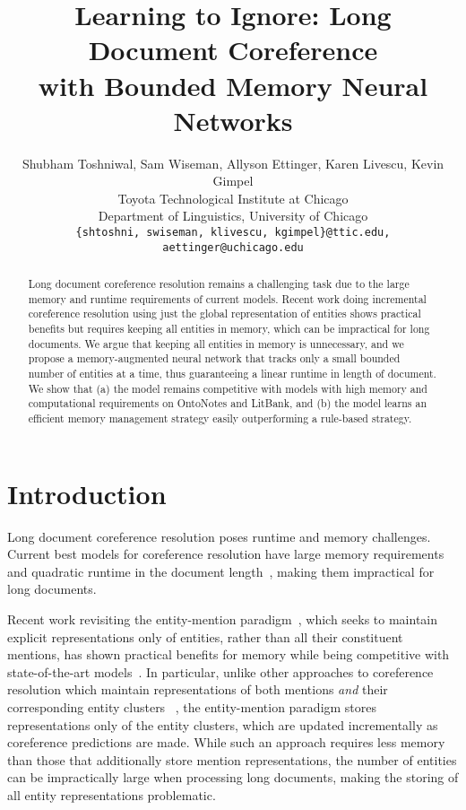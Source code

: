 \documentclass[11pt,a4paper]{article}
\author{Shubham Toshniwal\Mark{1},
Sam Wiseman\Mark{1},
Allyson Ettinger\Mark{2},
Karen Livescu\Mark{1},
Kevin Gimpel\Mark{1}
\\
\Mark{1}Toyota Technological Institute at Chicago\\
\Mark{2}Department of Linguistics, University of Chicago\\[0.5em]
\small{\texttt{\{shtoshni, swiseman, klivescu, kgimpel\}@ttic.edu, aettinger@uchicago.edu}}\\
}
\title{Learning to Ignore: Long Document Coreference \\ with Bounded Memory Neural Networks}
\date{}
\begin{document}
\maketitle
\begin{abstract}
Long document coreference resolution remains a challenging task	 due to the large memory and runtime requirements of current models.
Recent work doing incremental coreference resolution using just the global representation of entities shows practical benefits but requires keeping all entities in memory, which can be impractical for long documents. We argue that keeping all entities in memory is unnecessary, and we propose a memory-augmented neural network that tracks only a small bounded number of entities at a time, thus guaranteeing a linear runtime in length of document.
We show that (a) the model remains competitive with models with high memory and computational requirements on OntoNotes and LitBank, and (b) the model learns an efficient memory management strategy easily outperforming a rule-based strategy.

\end{abstract}


\section{Introduction}
Long document coreference resolution poses runtime and memory challenges.
Current best models for coreference resolution have large memory requirements and quadratic runtime in the document length~\citep{joshi-etal-2019-bert, wu2019coreference}, making them impractical for long documents. 

Recent work revisiting the entity-mention paradigm~\citep{luo-etal-2004-mention, websterC14}, which seeks to maintain explicit representations only of entities, rather than all their constituent mentions, has shown practical benefits for memory while being competitive with state-of-the-art models~\citep{xia2020revisiting}.
In particular, unlike other approaches to coreference resolution which maintain representations of both mentions \textit{and} their corresponding entity clusters~\citep{rahman2011narrowing, stoyanov-eisner-2012-easy, clark-manning-2015-entity, wiseman-etal-2016-learning,lee-etal-2018-higher}
, the entity-mention paradigm stores representations only of the entity clusters, which are updated incrementally as coreference predictions are made.
While such an approach requires less memory than those that additionally store mention representations, the number of entities can be impractically large when processing long documents, making the storing of all entity representations problematic.
\end{document}

